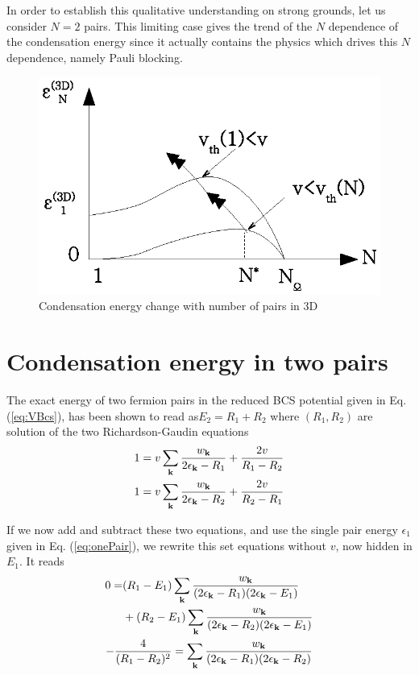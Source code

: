 \documentclass[aps,prb,showpacs,reprint]{revtex4-1}
\begin{document}
In order to establish this qualitative understanding on strong grounds, let us consider $N=2$ pairs. This limiting case gives the trend of the $N$ dependence of the condensation energy since it actually contains the physics which drives this $N$ dependence, namely Pauli blocking.  

\begin{figure}[htb]
	\centering
		\includegraphics{3dCondChange.eps}
	\caption{Condensation energy change with number of pairs in 3D}
	\label{fig:3dCondChange}
\end{figure}

\section{Condensation energy in two pairs\label{sec:twoPair}}
The exact energy of two fermion pairs in the reduced BCS potential given in Eq. (\ref{eq:VBcs}), has been shown to read as$E_2=R_1+R_2$ where $(R_1,R_2)$ are solution of the two Richardson-Gaudin equations
\begin{equation}
\begin{split}
1&=v\sum_{\mathbf{k}}\frac{w_{\mathbf{k}}}{2\epsilon_{\mathbf{k}}-R_1}+\frac{2v}{R_1-R_2}\\
1&=v\sum_{\mathbf{k}}\frac{w_{\mathbf{k}}}{2\epsilon_{\mathbf{k}}-R_2}+\frac{2v}{R_2-R_1}
\end{split}
\label{eq:richardsonEq}
\end{equation}

If we now add and subtract these two equations, and use the single pair energy $\epsilon_{1}$ given in  Eq. (\ref{eq:onePair}), we rewrite this set equations without $v$, now hidden in $E_{1}$.  It reads 
\begin{gather}
\begin{split}
0=&(R_1-E_1)\sum_{\mathbf{k}}\frac{w_{\mathbf{k}}}{(2\epsilon_{\mathbf{k}}-R_1)(2\epsilon_{\mathbf{k}}-E_1)}\\
&+(R_2-E_1)\sum_{\mathbf{k}}\frac{w_{\mathbf{k}}}{(2\epsilon_{\mathbf{k}}-R_2)(2\epsilon_{\mathbf{k}}-E_1)}\label{eq:2PairPlus}
\end{split}\\
-\frac{4}{(R_1-R_2)^2}=\sum_{\mathbf{k}}\frac{w_{\mathbf{k}}}{(2\epsilon_{\mathbf{k}}-R_1)(2\epsilon_{\mathbf{k}}-R_2)}\label{eq:2PairMinus}
\end{gather}
\end{document}
